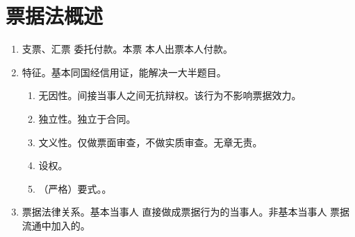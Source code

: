 \section{票据法概述}
\begin{enumerate}
  \item 支票、汇票 \yjt 委托付款。本票 \yjt 本人出票本人付款。
  \item 特征。基本同国经信用证，能解决一大半题目。
        \begin{enumerate}
          \item 无因性。\yi 间接当事人之间无抗辩权。\er 该行为不影响票据效力。
          \item 独立性。独立于合同。
          \item 文义性。仅做票面审查，不做实质审查。无章无责。
          \item 设权。
          \item （严格）要式。。
        \end{enumerate}
  \item 票据法律关系。基本当事人 \yjt 直接做成票据行为的当事人。非基本当事人 \yjt 票据流通中加入的。
\end{enumerate}
